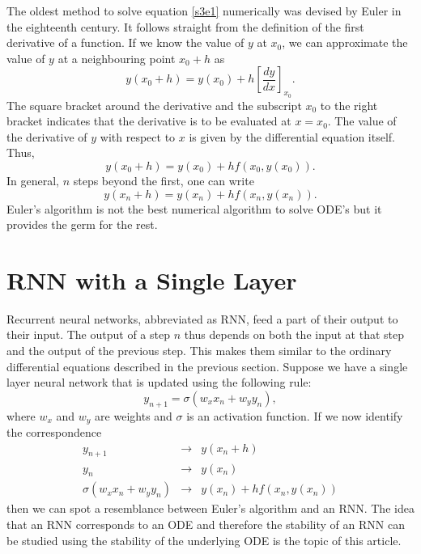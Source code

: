 \documentclass{article}
\numberwithin{equation}{section}
\begin{document}
The oldest method to solve equation \eqref{s3e1} numerically was devised 
by Euler in the eighteenth century. It follows straight from the definition
of the first derivative of a function. If we know the value of $y$ at $x_0$,
we can approximate the value of $y$ at a neighbouring point $x_0 + h$ as
\begin{equation}\label{s3e2}
y(x_0 + h) = y(x_0) + h\left[\frac{dy}{dx}\right]_{x_0}.
\end{equation}
The square bracket around the derivative and the subscript $x_0$ to the
right bracket indicates that the derivative is to be evaluated at $x = x_0$.
The value of the derivative of $y$ with respect to $x$ is given by
the differential equation itself. Thus,
\begin{equation}\label{s3e3}
y(x_0 + h) = y(x_0) + h f(x_0, y(x_0)).
\end{equation}
In general, $n$ steps beyond the first, one can write
\begin{equation}\label{s3e4}
y(x_n + h) = y(x_{n}) + h f(x_{n}, y(x_{n})).
\end{equation}
Euler's algorithm is not the best numerical algorithm to solve ODE's but
it provides the germ for the rest.

\section{RNN with a Single Layer}\label{s4}
Recurrent neural networks, abbreviated as RNN, feed a part of their output
to their input. The output of a step $n$ thus depends on both the input
at that step and the output of the previous step. This makes them similar
to the ordinary differential equations described in the previous section.
Suppose we have a single layer neural network that is updated using the
following rule:
\begin{equation}\label{s4e1}
y_{n+1} = \sigma(w_x x_{n} + w_y y_n),
\end{equation}
where $w_x$ and $w_y$ are weights and $\sigma$ is an activation function. 
If we now identify the correspondence
\begin{eqnarray}
y_{n+1} &\rightarrow& y(x_n + h) \\
y_{n} &\rightarrow& y(x_n) \\
\sigma(w_x x_n + w_y y_n) &\rightarrow& y(x_n) + hf(x_n, y(x_n))
\end{eqnarray}
then we can spot a resemblance between Euler's algorithm and an
RNN. The idea that an RNN corresponds to an ODE and therefore the stability
of an RNN can be studied using the stability of the underlying ODE is the
topic of this article.
\end{document}
